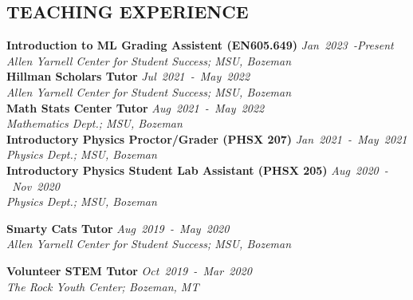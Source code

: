 \documentclass[margin]{res}
\begin{document}
\begin{resume}
\section{\uppercase{Teaching Experience}}
\textbf{Introduction to ML Grading Assistent (EN605.649)}\hfill
{\sl Jan~2023~-Present}\\
{\sl Allen Yarnell Center for Student Success; MSU, Bozeman}\vspace*{1ex}\\
\textbf{Hillman Scholars Tutor}\hfill
{\sl Jul~2021~-~May~2022}\\
{\sl Allen Yarnell Center for Student Success; MSU, Bozeman}\vspace*{1ex}\\
\textbf{Math Stats Center Tutor}\hfill
{\sl Aug~2021~-~May~2022}\\
{\sl Mathematics Dept.; MSU, Bozeman}\vspace*{1ex}\\
\textbf{Introductory Physics Proctor/Grader (PHSX 207)} \hfill 
{\sl Jan~2021~-~May~2021}\\
{\sl Physics Dept.; MSU, Bozeman}\vspace*{1ex}\\
\newpage
\textbf{Introductory Physics Student Lab Assistant (PHSX 205)}\hfill
{\sl Aug~2020~-~Nov~2020}\\
{\sl Physics Dept.; MSU, Bozeman}\vspace*{1ex}\\
\noindent
\raggedright
\textbf{Smarty Cats Tutor}\hfill
{\sl Aug~2019~-~May~2020}\\
{\sl Allen Yarnell Center for Student Success; MSU, Bozeman}\vspace*{1ex}\\
\noindent
\raggedright
\textbf{Volunteer STEM Tutor}\hfill
{\sl Oct~2019~-~Mar~2020}\\
{\sl The Rock Youth Center; Bozeman, MT}




\end{resume}
\end{document}
